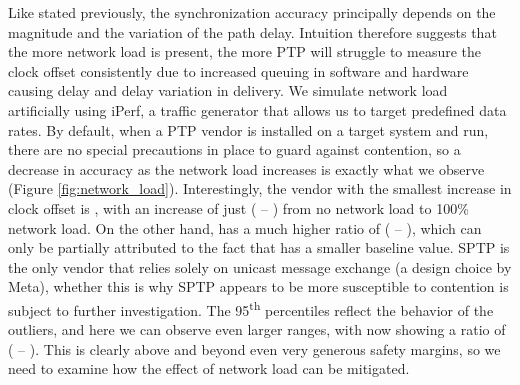 Like stated previously, the synchronization accuracy principally depends on the magnitude and the variation of the path delay. Intuition therefore suggests that the more network load is present, the more PTP will struggle to measure the clock offset consistently due to increased queuing in software and hardware causing delay and delay variation in delivery. We simulate network load artificially using iPerf, a traffic generator that allows us to target predefined data rates. By default, when a PTP vendor is installed on a target system and run, there are no special precautions in place to guard against contention, so a decrease in accuracy as the network load increases is exactly what we observe (Figure \ref{fig:network_load}). Interestingly, the vendor with the smallest increase in clock offset is \fVendor{\cmpMinArg}, with an increase of just \fRatio[1]{\cmpMin} ( -- ) from no network load to 100\% network load. On the other hand, \fVendor{\cmpMaxArg} has a much higher ratio of \fRatio{\cmpMax} ( -- ), which can only be partially attributed to the fact that \fVendor{\cmpMaxArg} has a smaller baseline value.
%
SPTP is the only vendor that relies solely on unicast message exchange (a design choice by Meta), whether this is why SPTP appears to be more susceptible to contention is subject to further investigation.%
%
%
The 95\textsuperscript{th} percentiles reflect the behavior of the outliers, and here we can observe even larger ranges, with \fVendor{\cmpMaxArg} now showing a ratio of \fRatio[-1]{\cmpMax} ( -- ). This is clearly above and beyond even very generous safety margins, so we need to examine how the effect of network load can be mitigated.

